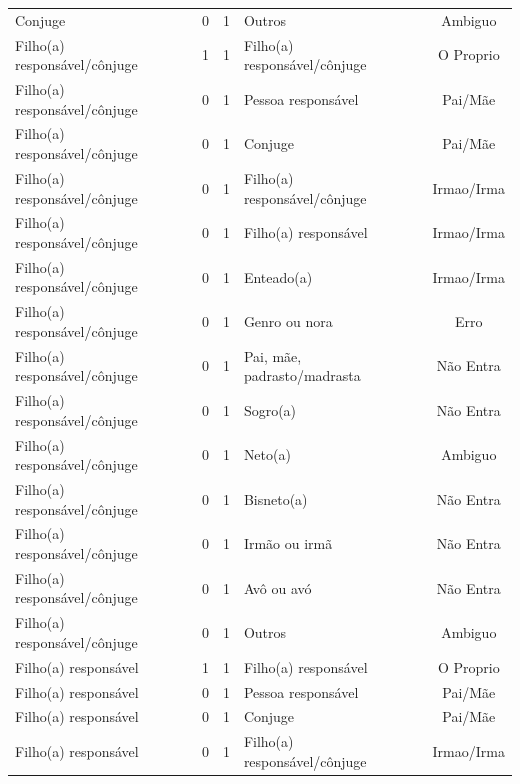 \documentclass[
	12pt,				%
	openright,			%
	twoside,			%
	a4paper,			%
	english,			%
	french,				%
	spanish,			%
	brazil				%
	]{abntex2}
\begin{document}
\begin{anexosenv}
\begin{longtable}{@{}lcclc@{}}
Conjuge                      & 0         & 1        & Outros                       & Ambiguo         \\
Filho(a) responsável/cônjuge & 1         & 1        & Filho(a) responsável/cônjuge & O Proprio       \\
Filho(a) responsável/cônjuge & 0         & 1        & Pessoa responsável           & Pai/Mãe         \\
Filho(a) responsável/cônjuge & 0         & 1        & Conjuge                      & Pai/Mãe         \\
Filho(a) responsável/cônjuge & 0         & 1        & Filho(a) responsável/cônjuge & Irmao/Irma      \\
Filho(a) responsável/cônjuge & 0         & 1        & Filho(a) responsável         & Irmao/Irma      \\
Filho(a) responsável/cônjuge & 0         & 1        & Enteado(a)                   & Irmao/Irma      \\
Filho(a) responsável/cônjuge & 0         & 1        & Genro ou nora                & Erro            \\
Filho(a) responsável/cônjuge & 0         & 1        & Pai, mãe, padrasto/madrasta  & Não Entra       \\
Filho(a) responsável/cônjuge & 0         & 1        & Sogro(a)                     & Não Entra       \\
Filho(a) responsável/cônjuge & 0         & 1        & Neto(a)                      & Ambiguo         \\
Filho(a) responsável/cônjuge & 0         & 1        & Bisneto(a)                   & Não Entra       \\
Filho(a) responsável/cônjuge & 0         & 1        & Irmão ou irmã                & Não Entra       \\
Filho(a) responsável/cônjuge & 0         & 1        & Avô ou avó                   & Não Entra       \\
Filho(a) responsável/cônjuge & 0         & 1        & Outros                       & Ambiguo         \\
Filho(a) responsável         & 1         & 1        & Filho(a) responsável         & O Proprio       \\
Filho(a) responsável         & 0         & 1        & Pessoa responsável           & Pai/Mãe         \\
Filho(a) responsável         & 0         & 1        & Conjuge                      & Pai/Mãe         \\
Filho(a) responsável         & 0         & 1        & Filho(a) responsável/cônjuge & Irmao/Irma      \\

\end{longtable}
\end{anexosenv}
\end{document}
